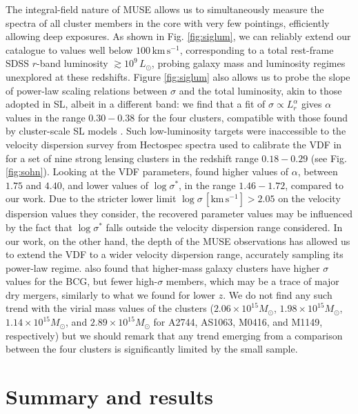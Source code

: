 \documentclass{aa}
\begin{document}
The integral-field nature of MUSE allows us to simultaneously measure the spectra of all cluster members in the core with very few pointings, efficiently allowing deep exposures. As shown in Fig. \ref{fig:siglum}, we can reliably extend our catalogue to values well below $100 \mathrm{\,km \, s^{-1}}$, corresponding to a total rest-frame SDSS $r$-band luminosity $\gtrsim 10^9 \, L_\odot$, probing galaxy mass and luminosity regimes unexplored at these redshifts. Figure \ref{fig:siglum} also allows us to probe the slope of power-law scaling relations between $\sigma$ and the total luminosity, akin to those adopted in SL, albeit in a different band: we find that a fit of $\sigma\propto L_r^\alpha$ gives $\alpha$ values in the range $0.30-0.38$ for the four clusters, compatible with those found by cluster-scale SL models \citep[see][]{granata25}. Such low-luminosity targets were inaccessible to the velocity dispersion survey from Hectospec spectra used to calibrate the VDF in \citet{sohn20} for a set of nine strong lensing clusters in the redshift range $0.18-0.29$ (see Fig. \ref{fig:sohn}). Looking at the VDF parameters, \citet{sohn20} found higher values of $\alpha$, between $1.75$ and $4.40$, and lower values of $\log\sigma^*$, in the range $1.46-1.72$, compared to our work. Due to the stricter lower limit $\log\sigma\, [\mathrm{km\,s^{-1}}]>2.05$ on the velocity dispersion values they consider, the recovered parameter values may be influenced by the fact that $\log\sigma^*$ falls outside the velocity dispersion range considered. In our work, on the other hand, the depth of the MUSE observations has allowed us to extend the VDF to a wider velocity dispersion range, accurately sampling its power-law regime. \citet{sohn20} also found that higher-mass galaxy clusters have higher $\sigma$ values for the BCG, but fewer high-$\sigma$ members, which may be a trace of major dry mergers, similarly to what we found for lower $z$. We do not find any such trend with the virial mass values of the clusters ($2.06 \times 10^{15} M_\odot$, $1.98\times 10^{15} M_\odot$, $1.14\times 10^{15} M_\odot$, and $2.89\times 10^{15} M_\odot$ for A2744, AS1063, M0416, and M1149, respectively) but we should remark that any trend emerging from a comparison between the four clusters is significantly limited by the small sample.
   
\section{Summary and results}\label{s6}
\end{document}
